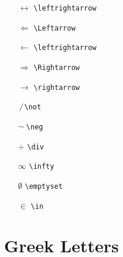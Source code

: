 \begin{multicols}{3}
\begin{itemize}
\item[$\leftrightarrow$] \texttt{\textbackslash leftrightarrow}
\item[$\Leftarrow$] \texttt{\textbackslash Leftarrow}
\item[$\leftarrow$] \texttt{\textbackslash leftrightarrow}
\item[$\Rightarrow$] \texttt{\textbackslash Rightarrow}
\item[$\rightarrow$] \texttt{\textbackslash rightarrow}
\item[$\not ~$] \texttt{\textbackslash not}
\item[$\neg$] \texttt{\textbackslash neg}
\item[$\div$] \texttt{\textbackslash div}
\item[$\infty$] \texttt{\textbackslash infty}
\item[$\emptyset$] \texttt{\textbackslash emptyset}
\item[$\in$] \texttt{\textbackslash in}
\end{itemize}
\end{multicols}

\section{Greek Letters}

